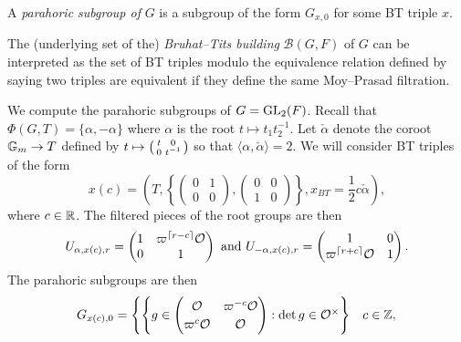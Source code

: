\begin{defn}
    A \textit{parahoric subgroup of} $G$ is a subgroup of the form $G_{x,0}$ for some BT triple $x$.
\end{defn}

\begin{rem}
    The (underlying set of the) \textit{Bruhat--Tits building} $\mathcal B(G,F)$ of $G$ can be interpreted as the set of BT triples modulo the equivalence relation defined by saying two triples are equivalent if they define the same Moy--Prasad filtration.
\end{rem}

\begin{example}
    We compute the parahoric subgroups of $G=\GL_2(F)$. Recall that $\Phi(G,T)=\{\alpha,-\alpha\}$ where $\alpha$ is the root $t \mapsto t_1t_2^{-1}$. Let $\check\alpha$ denote the coroot $\GG_m \to T$ defined by $t \mapsto \begin{psmallmatrix}
        t&0\\0&t^{-1}
    \end{psmallmatrix}$ so that $\langle \alpha,\check \alpha\rangle=2$. We will consider BT triples of the form 
    $$x(c) = \left(T, \left\{\begin{pmatrix}
        0&1\\0&0
    \end{pmatrix}, \begin{pmatrix}
        0&0\\1&0
    \end{pmatrix}\right\}, x_{BT} = \frac{1}{2}c\check\alpha\right),$$ where $c \in \RR$. The filtered pieces of the root groups are then 
    $$U_{\alpha,x(c),r} = \begin{pmatrix}
        1& \varpi^{\lceil r-c\rceil}\cO \\ 0 & 1
    \end{pmatrix} \text{ and } U_{-\alpha,x(c),r} = \begin{pmatrix}
        1& 0 \\ \varpi^{\lceil r+c\rceil}\cO & 1
    \end{pmatrix}.$$
    The parahoric subgroups are then 
    $$
    G_{x(c),0} = 
    \begin{cases}
        \left\{
        g \in    
        \begin{pmatrix}
            \cO & \varpi^{-c}\cO \\ \varpi^{c} \cO & \cO
        \end{pmatrix} : \det g \in \cO^\times
        \right\} & c \in \ZZ, \\

\end{cases}$$
\end{example}
